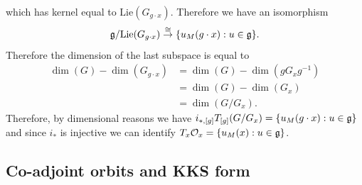 \begin{itemize}
\begin{equation}
        \end{equation}
        which has kernel equal to $\text{Lie}(G_{g\cdot x})$. Therefore we have an isomorphism
        \begin{equation}
            \mathfrak{g}/\text{Lie}(G_{g\cdot x})\overset{\cong}{\to}\{u_M(g\cdot x):u\in\mathfrak{g}\}.
        \end{equation}
        Therefore the dimension of the last subspace is equal to 
        \begin{equation}
            \begin{split}
                \dim(G)-\dim(G_{g\cdot x})&=\dim(G)-\dim(gG_xg^{-1})\\
                &=\dim(G)-\dim(G_x)\\
                &=\dim(G/G_x).
            \end{split}
        \end{equation}
        Therefore, by dimensional reasons we have $i_{*,[g]}T_{[g]}(G/G_x)=\{u_M(g\cdot x):u\in\mathfrak{g}\}$ and since 
        $i_*$ is injective we can identify $T_x{\mathcal{O}_x}=\{u_M(x):u\in\mathfrak{g}\}$.
\end{itemize}

\subsection{Co-adjoint orbits and KKS form}


